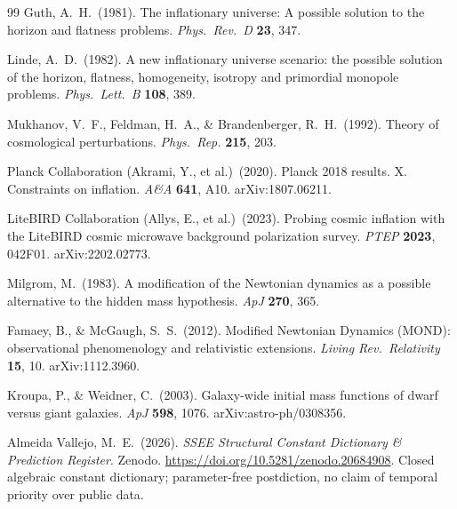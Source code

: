 \documentclass[12pt,a4paper]{article}
\begin{document}
\begin{thebibliography}{99}
Guth, A.~H.\ (1981).
The inflationary universe: A possible solution to the horizon and flatness problems.
\textit{Phys.\ Rev.\ D} \textbf{23}, 347.

Linde, A.~D.\ (1982).
A new inflationary universe scenario: the possible solution of the horizon, flatness,
homogeneity, isotropy and primordial monopole problems.
\textit{Phys.\ Lett.\ B} \textbf{108}, 389.

Mukhanov, V.~F., Feldman, H.~A., \& Brandenberger, R.~H.\ (1992).
Theory of cosmological perturbations.
\textit{Phys.\ Rep.} \textbf{215}, 203.

Planck Collaboration (Akrami, Y., et al.)\ (2020).
Planck 2018 results. X. Constraints on inflation.
\textit{A\&A} \textbf{641}, A10. arXiv:1807.06211.

LiteBIRD Collaboration (Allys, E., et al.)\ (2023).
Probing cosmic inflation with the LiteBIRD cosmic microwave background polarization survey.
\textit{PTEP} \textbf{2023}, 042F01. arXiv:2202.02773.

Milgrom, M.\ (1983).
A modification of the Newtonian dynamics as a possible alternative to the hidden mass hypothesis.
\textit{ApJ} \textbf{270}, 365.

Famaey, B., \& McGaugh, S.~S.\ (2012).
Modified Newtonian Dynamics (MOND): observational phenomenology and relativistic extensions.
\textit{Living Rev.\ Relativity} \textbf{15}, 10. arXiv:1112.3960.

Kroupa, P., \& Weidner, C.\ (2003).
Galaxy-wide initial mass functions of dwarf versus giant galaxies.
\textit{ApJ} \textbf{598}, 1076. arXiv:astro-ph/0308356.

Almeida Vallejo, M.~E.\ (2026).
\textit{SSEE Structural Constant Dictionary \& Prediction Register}.
Zenodo. \url{https://doi.org/10.5281/zenodo.20684908}.
Closed algebraic constant dictionary; parameter-free postdiction, no claim of
temporal priority over public data.

\end{thebibliography}
\end{document}
